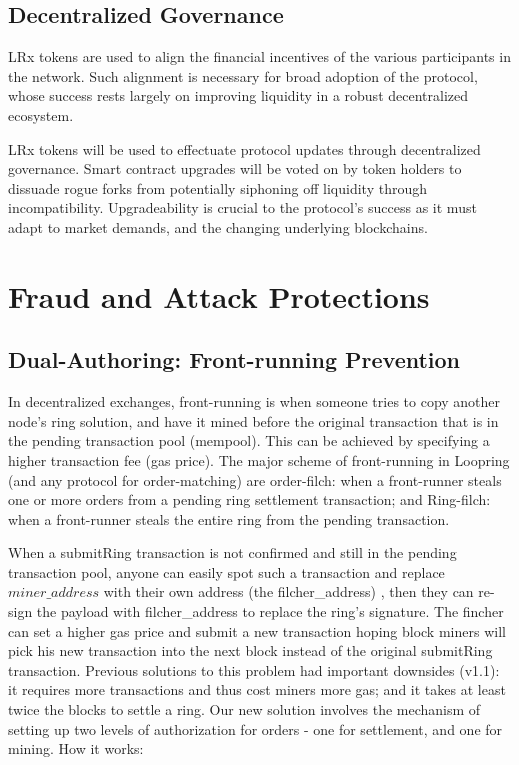\documentclass[UTF8,nofonts]{article}
\begin{document}
\subsection{Decentralized Governance}
LRx tokens are used to align the financial incentives of the various participants in the network. Such alignment is necessary for broad adoption of the protocol, whose success rests largely on improving liquidity in a robust decentralized ecosystem.

LRx tokens will be used to effectuate protocol updates through decentralized governance. Smart contract upgrades will be voted on by token holders to dissuade rogue forks from potentially siphoning off liquidity through incompatibility. Upgradeability is crucial to the protocol's success as it must adapt to market demands, and the changing underlying blockchains.

\section{Fraud and Attack Protections}

\subsection{Dual-Authoring: Front-running Prevention}

In decentralized exchanges, front-running is when someone tries to copy another node's ring solution, and have it mined before the original transaction that is in the pending transaction pool (mempool). This can be achieved by specifying a higher transaction fee (gas price). The major scheme of front-running in Loopring (and any protocol for order-matching) are order-filch: when a front-runner steals one or more orders from a pending ring settlement transaction; and Ring-filch: when a front-runner steals the entire ring from the pending transaction.

When a submitRing transaction is not confirmed and still in the pending transaction pool, anyone can easily spot such a transaction and replace $miner\_address$ with their own address (the filcher\_address) , then they can re-sign the payload with filcher\_address to replace the ring's signature. The fincher can set a higher gas price and submit a new transaction hoping block miners will pick his new transaction into the next block instead of the original submitRing transaction.
Previous solutions to this problem had important downsides (v1.1): it requires more transactions and thus cost miners more gas; and it takes at least twice the blocks to settle a ring.  Our new solution involves the mechanism of setting up two levels of authorization for orders - one for settlement, and one for mining.
How it works:
\end{document}
